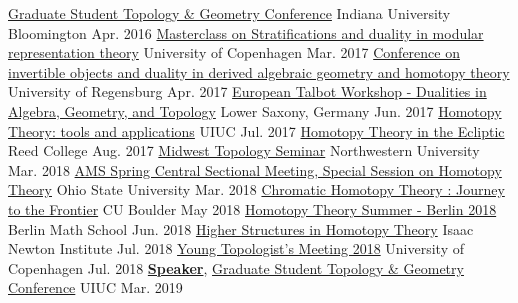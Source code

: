 \begin{conferences}
  \conference
    {}
    {\href{https://www.indiana.edu/~gstc/}{Graduate Student Topology \& Geometry Conference}}
    {Indiana University Bloomington}
    {Apr. 2016}
  \conference
    {}
    {\href{http://www.math.ku.dk/english/research/conferences/2017/stratifications-and-duality/}{Masterclass on Stratifications and duality in modular representation theory}}
    {University of Copenhagen}
    {Mar. 2017}
  \conference
    {}
    {\href{http://www-cgi.uni-regensburg.de/Fakultaeten/MAT/sfb-higher-invariants/index.php/SpringSchool2017}{Conference on invertible objects and duality in derived algebraic geometry and homotopy theory}}
    {University of Regensburg}
    {Apr. 2017}
  \conference
    {}
    {\href{http://hessbellwald-lab.epfl.ch/talbot17}{European Talbot Workshop - Dualities in Algebra, Geometry, and Topology}}
    {Lower Saxony, Germany}
    {Jun. 2017}
  \conference
    {}
    {\href{http://www.math.illinois.edu/homotopy2017/}{Homotopy Theory: tools and applications}}
    {UIUC}
    {Jul. 2017}
  \conference
    {}
    {\href{https://sites.google.com/site/eclipseconference/}{Homotopy Theory in the Ecliptic}}
    {Reed College}
    {Aug. 2017}
  \conference
    {}
    {\href{http://www.math.northwestern.edu/~pvankoug/MTS2018/index.html}{Midwest Topology Seminar}}
    {Northwestern University}
    {Mar. 2018}    
  \conference
    {}
    {\href{http://www.ams.org/meetings/sectional/2250_program_ss29.html}{AMS Spring Central Sectional Meeting, Special Session on Homotopy Theory}}
    {Ohio State University}
    {Mar. 2018}   
  \conference
    {}
    {\href{https://sites.google.com/view/chtjourney}{Chromatic Homotopy Theory : Journey to the Frontier}}
    {CU Boulder}
    {May 2018}
  \conference
    {}
    {\href{https://www.math-berlin.de/academics/summer-schools/2018}{Homotopy Theory Summer - Berlin 2018}}
    {Berlin Math School}
    {Jun. 2018}
  \conference
    {}
    {\href{https://www.newton.ac.uk/event/hhhw01}{Higher Structures in Homotopy Theory}}
    {Isaac Newton Institute}
    {Jul. 2018}
  \conference
    {}
    {\href{http://www.math.ku.dk/english/research/conferences/2018/ytm2018/}{Young Topologist's Meeting 2018}}
    {University of Copenhagen}
    {Jul. 2018}
  \conference
    {}
    {\textbf{\href{https://web.ma.utexas.edu/users/richard.wong/slides/YTM_Picard_Group_Talk.pdf}{Speaker}}, \href{https://faculty.math.illinois.edu/~hquan4/GSTGC2019/index.html}{Graduate Student Topology \& Geometry Conference}}
    {UIUC}
    {Mar. 2019}
  \conference

\end{conferences}
